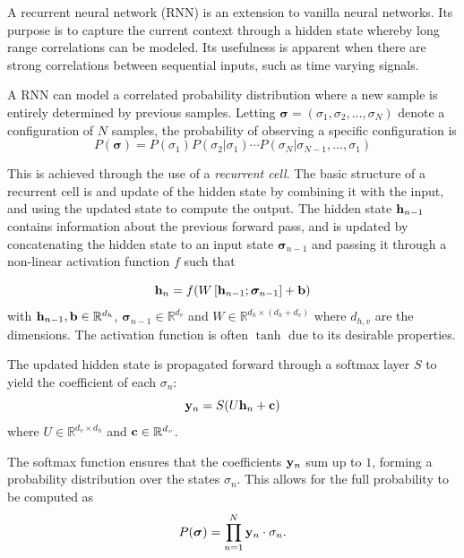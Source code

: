 A recurrent neural network (RNN) is an extension to vanilla neural networks. Its purpose is to
capture the current context through a hidden state whereby long
range correlations can be modeled. Its usefulness is apparent when there are
strong correlations between sequential inputs, such as time varying signals.

A RNN can model a correlated probability distribution where a new sample is
entirely determined by previous samples. 
Letting \(\bm{\sigma} = \left(\sigma_{1}, \sigma_{2}, \ldots,
  \sigma_{N}\right)\)  denote a configuration of \(N\) samples, the
probability of observing a specific configuration is
\begin{equation*}
  P(\bm\sigma) = P(\sigma_{1})P(\sigma_{2}|\sigma_{1})\cdots P(\sigma_{N}|\sigma_{N-1},\ldots,\sigma_{1})
\end{equation*}

This is achieved through the use of a \textit{recurrent cell}. The basic
structure of a recurrent cell is and update of the hidden state by 
combining it with the input, and using the updated state to compute the output.
The hidden state \(\vb{h}_{n-1}\)
contains information about the previous forward pass, and is updated by
concatenating the hidden state to an input state \(\bm{\sigma}_{n-1}\) and passing
it through a non-linear activation function \(f\) such that

\begin{equation*}
  \vb{h}_{n} = f(W\left[ \vb{h}_{n-1};\bm{\sigma}_{n-1} \right] + \vb{b})
\end{equation*}
with \(\vb{h}_{n-1},\vb{b}\in \mathbb{R}^{d_{h}}\),
\(\bm{\sigma}_{n-1}\in\mathbb{R}^{d_{v}}\) and \(W\in\mathbb{R}^{d_{h}\times
  (d_{h}+d_{v})}\) where \(d_{h,v}\) are the dimensions. The activation function
is often \(\tanh\) due to its desirable properties.

The updated hidden state is propagated forward through a softmax layer \(S\) to yield
the coefficient of each \(\sigma_{n}\):
\begin{equation*}
  \vb{y}_{n} = S(U\vb{h}_{n} + \vb{c})
\end{equation*}
where \(U\in\mathbb{R}^{d_{v}\times d_{h}}\) and
\(\vb{c}\in\mathbb{R}^{d_{v}}\).

The softmax function ensures that the
coefficients \(\vb{y}_{n}\) sum up to \(1\), forming a probability distribution
over the states \(\sigma_{n}\). This allows for the full probability to be
computed as
\begin{equation*}
  P(\bm{\sigma}) = \prod_{n=1}^{N}\vb{y}_{n}\cdot \sigma_{n}.
\end{equation*}


